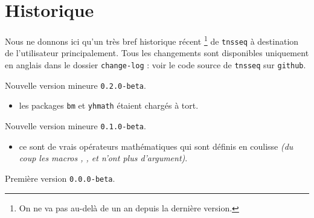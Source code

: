 \documentclass[12pt,a4paper]{article}
\begin{document}
\newpage

\section{Historique}

Nous ne donnons ici qu'un très bref historique récent
\footnote{
	On ne va pas au-delà de un an depuis la dernière version.
}
de \verb+tnsseq+ à destination de l'utilisateur principalement.
Tous les changements sont disponibles uniquement en anglais dans le dossier \verb+change-log+ : voir le code source de \verb+tnsseq+ sur \verb+github+.

\begin{description}

    \medskip
    \item[2021-03-03] Nouvelle version mineure \verb+0.2.0-beta+.
    
    \begin{itemize}[itemsep=.5em]
        \item {}
              les packages \verb#bm# et \verb#yhmath# étaient chargés à tort.   
    \end{itemize}
    
    \separation


    \medskip
    \item[2020-08-08] Nouvelle version mineure \verb+0.1.0-beta+.
    
    \begin{itemize}[itemsep=.5em]
        \item {}
              ce sont de vrais opérateurs mathématiques qui sont définis en coulisse \emph{(du coup les macros , ,  et  n'ont plus d'argument)}.   
    \end{itemize}
    
    \separation


    \medskip
    \item[2020-07-10] Première version \verb+0.0.0-beta+.

\end{description}
\end{document}
